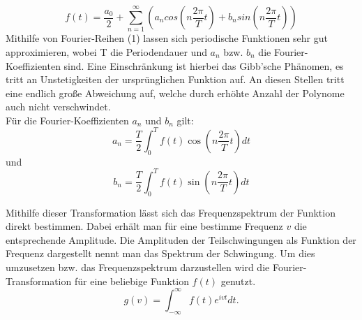 \begin{equation} 
f(t) = \frac{a_0}{2} + \sum_{n=1}^\infty (a_n cos(n\frac{2\pi}{T}t) + b_n sin(n\frac{2\pi}{T}t)) 
\end{equation}
Mithilfe von Fourier-Reihen (1) lassen sich periodische Funktionen sehr gut approximieren, wobei T die Periodendauer und $a_n$ bzw. $b_n$ die Fourier-Koeffizienten sind. Eine Einschränkung ist hierbei das Gibb'sche Phänomen, es tritt an Unstetigkeiten der ursprünglichen Funktion auf. An diesen Stellen tritt eine endlich große Abweichung auf, welche durch erhöhte Anzahl der Polynome auch nicht verschwindet. \\
Für die Fourier-Koeffizienten $a_n$ und $b_n$ gilt:
\begin{equation}
a_n = \frac{T}{2}\int_{0}^{T} f(t) \cos(n\frac{2\pi}{T}t) dt
\end{equation}
und
\begin{equation}
b_n = \frac{T}{2}\int_{0}^{T} f(t) \sin(n\frac{2\pi}{T}t) dt
\end{equation}

Mithilfe dieser Transformation lässt sich das Frequenzspektrum der Funktion direkt bestimmen. 
Dabei erhält man für eine bestimme Frequenz $v$ die entsprechende Amplitude.
Die Amplituden der Teilschwingungen als Funktion der Frequenz dargestellt
nennt man das Spektrum der Schwingung.
Um dies umzusetzen bzw. das Frequenzspektrum darzustellen wird die Fourier-Transformation für eine beliebige 
Funktion $f(t)$ genutzt.
\begin{equation}
g(v) = \int_{-\infty}^{\infty} f(t) e^{ivt} dt.
\end{equation}
